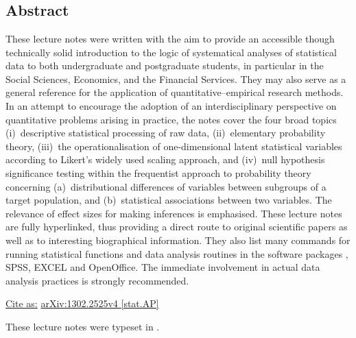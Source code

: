 \chapter*{}
\vspace{-8ex}
\section*{Abstract}
{\small These lecture notes were written with the aim to provide 
an accessible though technically solid introduction to the logic 
of systematical analyses of statistical data to both undergraduate 
and postgraduate students, in particular in the Social Sciences, 
Economics, and the Financial Services. They may also serve as a
general reference for the application of quantitative--empirical
research methods. In an attempt to encourage the adoption of an 
interdisciplinary perspective on quantitative problems arising in
practice, the notes cover the four broad topics (i)~descriptive
statistical processing of raw data, (ii)~elementary probability
theory, (iii)~the operationalisation of one-dimensional latent
statistical variables according to Likert's widely used scaling
approach, and (iv)~null hypothesis significance testing within the
frequentist approach to probability theory concerning 
(a)~distributional differences of variables between subgroups of a 
target population, and (b)~statistical associations between two 
variables. The relevance of effect sizes for making inferences is
emphasised. These lecture notes are fully hyperlinked, thus
providing a direct route to original scientific papers as well as
to interesting biographical information. They also list many
commands for running statistical functions and data analysis
routines in the software packages \R{}, SPSS, EXCEL and
OpenOffice. The immediate involvement in actual data analysis
practices is strongly recommended.}

\vspace{10mm}
\noindent
\underline{Cite as:} 
\href{http://arxiv.org/abs/1302.2525}{arXiv:1302.2525v4 [stat.AP]}
\vfill

\medskip
\noindent
These lecture notes were typeset in \LaTeXe.

